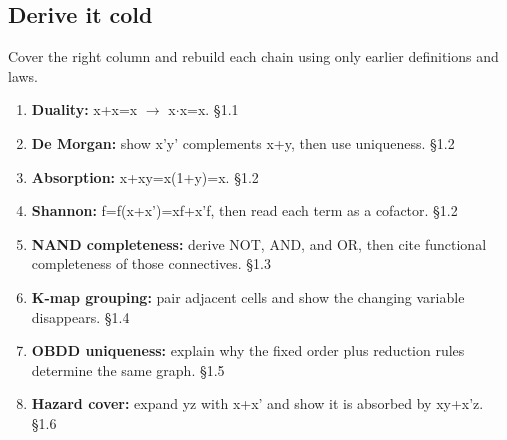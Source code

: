 \documentclass[11pt]{article}
\begin{document}
\begin{keepsection}
\section{Derive it cold}

Cover the right column and rebuild each chain using only earlier definitions and laws.

\begin{enumerate}
\item \textbf{Duality:} x+x=x \ensuremath{\to} x\ensuremath{\cdot}x=x. \hfill{\small\color{FAUblue}§1.1}
\item \textbf{De Morgan:} show x'y' complements x+y, then use uniqueness. \hfill{\small\color{FAUblue}§1.2}
\item \textbf{Absorption:} x+xy=x(1+y)=x. \hfill{\small\color{FAUblue}§1.2}
\item \textbf{Shannon:} f=f(x+x')=xf+x'f, then read each term as a cofactor. \hfill{\small\color{FAUblue}§1.2}
\item \textbf{NAND completeness:} derive NOT, AND, and OR, then cite functional completeness of those connectives. \hfill{\small\color{FAUblue}§1.3}
\item \textbf{K-map grouping:} pair adjacent cells and show the changing variable disappears. \hfill{\small\color{FAUblue}§1.4}
\item \textbf{OBDD uniqueness:} explain why the fixed order plus reduction rules determine the same graph. \hfill{\small\color{FAUblue}§1.5}
\item \textbf{Hazard cover:} expand yz with x+x' and show it is absorbed by xy+x'z. \hfill{\small\color{FAUblue}§1.6}
\end{enumerate}
\end{keepsection}
\end{document}
